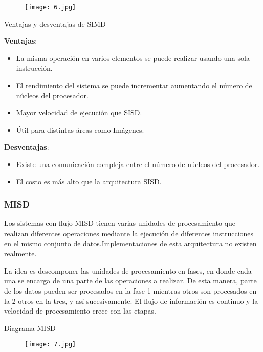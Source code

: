 \begin{figure}[h!]
		\centering
		{\texttt{[image: 6.jpg]}\par} \vspace{1cm}
\end{figure}

\begin{center}
Ventajas y desventajas de SIMD
\end{center}

{\raggedright
\textbf{Ventajas}:
}

\begin{itemize}
	\item La misma operación en varios elementos se puede realizar usando una sola instrucción.
	\item El rendimiento del sistema se puede incrementar aumentando el número de núcleos del procesador.
	\item Mayor velocidad de ejecución que SISD.
	\item Útil para distintas áreas como Imágenes.
\end{itemize}

{\raggedright
\textbf{Desventajas}:
}

\begin{itemize}
	\item Existe una comunicación compleja entre el número de núcleos del procesador.
	\item El costo es más alto que la arquitectura SISD.
\end{itemize}

{\raggedright
\subsubsection{\textbf{MISD}}
}

Los sistemas con flujo MISD tienen varias unidades de procesamiento que realizan diferentes operaciones mediante la ejecución de diferentes instrucciones en el mismo conjunto de datos.Implementaciones de esta arquitectura no existen realmente.

La idea es descomponer las unidades de procesamiento en fases, en donde cada una se encarga de una parte de las operaciones a realizar. De esta manera, parte de los datos pueden ser procesados en la fase 1 mientras otros son procesados en la 2 otros en la tres, y así sucesivamente. El flujo de información es continuo y la velocidad de procesamiento crece con las etapas.
\vspace{1cm}
\begin{center}
Diagrama MISD
\end{center}
\begin{figure}[h!]
		\centering
		{\texttt{[image: 7.jpg]}\par} \vspace{1cm}
\end{figure}

